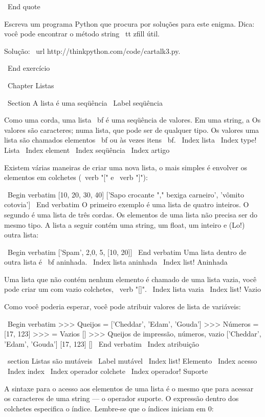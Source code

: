 \documentclass[10pt]{book}
\begin{document}
{{{{{{\ End {quote}

Escreva um programa Python que procura por soluções para este enigma.
Dica: você pode encontrar o método string {\ tt zfill} útil.

Solução: \ url {http://thinkpython.com/code/cartalk3.py}.

\ End {} exercício



\ Chapter {Listas}

\ Section {A lista é uma seqüência}
\ Label {seqüência}

Como uma corda, uma lista {\ bf} é uma seqüência de valores. Em uma string, a
Os valores são caracteres; numa lista, que pode ser de qualquer tipo. Os valores
uma lista são chamados elementos {\ bf} ou às vezes {itens \ bf}.
\ Index {lista}
\ Index {type! Lista}
\ Index {element}
\ Index {seqüência}
\ Index {artigo}

Existem várias maneiras de criar uma nova lista, o mais simples é
envolver os elementos em colchetes (\ verb "[" e \ verb "]"):

\ Begin {verbatim}
[10, 20, 30, 40]
['Sapo crocante "," bexiga carneiro', 'vômito cotovia']
\ End {verbatim}
%
O primeiro exemplo é uma lista de quatro inteiros. O segundo é uma lista de
três cordas. Os elementos de uma lista não precisa ser do mesmo tipo.
A lista a seguir contém uma string, um float, um inteiro e
(Lo!) outra lista:

\ Begin {verbatim}
['Spam', 2,0, 5, [10, 20]]
\ End {verbatim}
%
Uma lista dentro de outra lista é {\ bf aninhada}.
\ Index {lista aninhada}
\ Index {list! Aninhada}

Uma lista que não contém nenhum elemento é
chamado de uma lista vazia, você pode criar um com vazio
colchetes, \ verb "[]".
\ Index {lista vazia}
\ Index {list! Vazio}

Como você poderia esperar, você pode atribuir valores de lista de variáveis:

\ Begin {verbatim}
>>> Queijos = ['Cheddar', 'Edam', 'Gouda']
>>> Números = [17, 123]
>>> = Vazios []
>>> Queijos de impressão, números, vazio
['Cheddar', 'Edam', 'Gouda'] [17, 123] []
\ End {verbatim}
%
\ Index {atribuição}


\ section {} Listas são mutáveis
\ Label {} mutável
\ Index {list! Elemento}
\ Index {acesso}
\ Index {index}
\ Index {operador colchete}
\ Index {operador! Suporte}

A sintaxe para o acesso aos elementos de uma lista é o mesmo que para
acessar os caracteres de uma string --- o operador suporte. O
expressão dentro dos colchetes especifica o índice. Lembre-se que o
índices iniciam em 0:

}}}}}}
\end{document}
